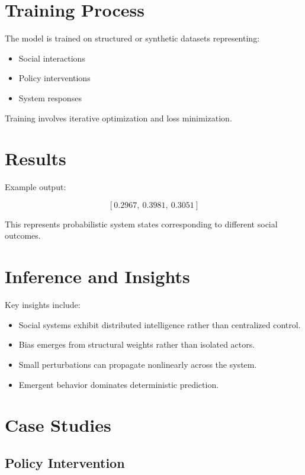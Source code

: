 \documentclass[12pt]{article}
\begin{document}
\section*{Training Process}

The model is trained on structured or synthetic datasets representing:

\begin{itemize}
\item Social interactions
\item Policy interventions
\item System responses
\end{itemize}

Training involves iterative optimization and loss minimization.

\section*{Results}

Example output:

\[
[0.2967,\ 0.3981,\ 0.3051]
\]

This represents probabilistic system states corresponding to different social outcomes.

\section*{Inference and Insights}

Key insights include:

\begin{itemize}
\item Social systems exhibit distributed intelligence rather than centralized control.
\item Bias emerges from structural weights rather than isolated actors.
\item Small perturbations can propagate nonlinearly across the system.
\item Emergent behavior dominates deterministic prediction.
\end{itemize}

\section*{Case Studies}

\subsection*{Policy Intervention}
\end{document}
